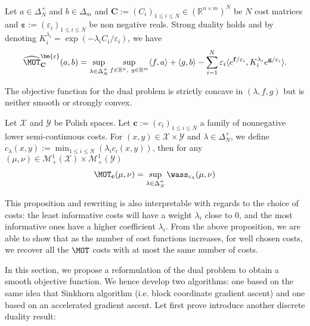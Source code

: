 \begin{prop}
\label{prop:discrete-reg-dual}
Let $a\in\Delta_N^{+}$ and $b\in\Delta_m$ and $\mathbf{C}:=(C_i)_{1\leq i\leq N}\in\left(\mathbb{R}^{n\times m}\right)^N$ be $N$ cost matrices and $\bm{\varepsilon}:=(\varepsilon_i)_{1\leq i\leq N}$ be non negative reals. Strong duality holds and by denoting $K_i^{\lambda_i} =\exp\left(-\lambda_i C_{i}/\varepsilon_i\right)$, we have
\begin{align*}
\widehat{\MOT}_{\mathbf{C}}^{\bm{\varepsilon}}(a,b)=\sup_{\lambda\in\Delta_N^{+}}\sup\limits_{f\in \mathbb{R}^n,~g\in \mathbb{R}^m} \langle f, a\rangle+\langle g,b\rangle-\sum_{i=1}^N\varepsilon_i\langle e^{\mathbf{f}/\varepsilon_i},K_i^{\lambda_i} e^{\mathbf{g}/\varepsilon_i}\rangle.
\end{align*}
\end{prop}
The objective function for the dual problem is strictly concave in $(\lambda,f,g)$ but is neither smooth or strongly convex. 




\begin{prop} 
\label{prop:sup_wasser}
Let $\mathcal{X}$ and $\mathcal{Y}$ be Polish spaces. Let $\mathbf{c}:=(c_i)_{1\leq i\leq N}$ a family of nonnegative lower semi-continuous costs. For $(x,y)\in \mathcal{X}\times \mathcal{Y}$ and $\lambda\in\Delta_N^{+}$, we define $c_\lambda(x,y):=\min_{1\leq i\leq N}(\lambda_i c_i(x,y))$, then for any $(\mu,\nu)\in\mathcal{M}_+^{1}(\mathcal{X})\times\mathcal{M}_+^{1}(\mathcal{Y})$  
\begin{align}
    \MOT_{\mathbf{c}}(\mu,\nu)=\sup_{\lambda\in\Delta_N^{+}} \wass_{c_\lambda}(\mu,\nu)
\end{align}
\end{prop}
This proposition and rewriting is also interpretable with regards to the choice of costs: the least informative costs will have  a weight $\lambda_i$ close to $0$, and the most informative ones  have a higher coefficient $\lambda_i$.  From the above proposition, we are able to show that as the number of cost functions increases, for well chosen costs, we recover all the $\MOT$ costs with at most the same number of costs.

In this section, we propose a reformulation of the dual problem to obtain a smooth objective function. We hence develop two algorithms: one based on the same idea that Sinkhorn algorithm (i.e. block coordinate gradient ascent) and one based on an accelerated gradient ascent. Let first prove introduce another discrete duality result:

